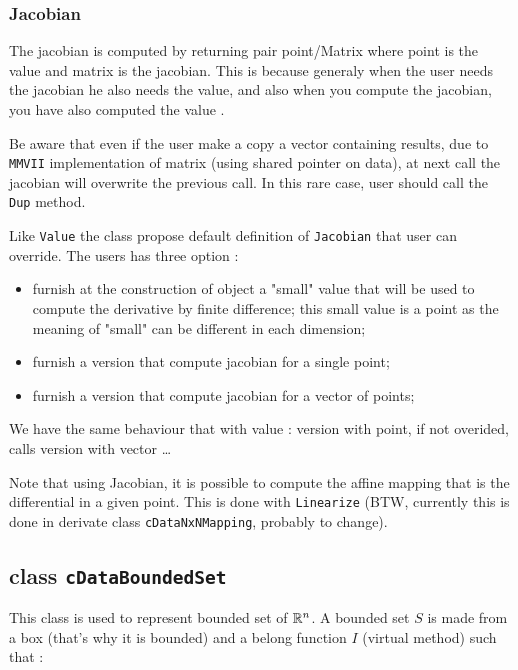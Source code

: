 \subsubsection{Jacobian}

The jacobian is computed by returning pair point/Matrix  where point is
the value  and matrix is the  jacobian. This is because generaly when the 
user needs the jacobian he also needs the value, and also when you 
compute the jacobian, you have also computed the value .

Be aware that even if the user make a copy a vector containing results,
due to {\tt MMVII} implementation of matrix (using shared pointer on data),
at next call the jacobian will overwrite the previous call.  In this rare
case, user should call the {\tt Dup} method.

Like {\tt Value} the  class propose default definition of {\tt Jacobian} that user can override.
The users has three option :

\begin{itemize}
      \item  furnish at the construction of object a "small" value that will be used to 
	      compute the derivative by finite difference;  this small value is a point as  the
             meaning of "small" can be different in each dimension;

      \item  furnish a version that compute jacobian for a single point;

      \item  furnish a version that compute jacobian for a vector of  points;
\end{itemize}

We have the same behaviour that with value : version with point, if not overided, calls version
with vector \dots 

Note that using Jacobian, it is possible to compute the affine mapping that is the
differential in a given point. This is done with {\tt Linearize}  (BTW, currently
this is done in derivate class {\tt cDataNxNMapping}, probably to change).


\subsection{class {\tt cDataBoundedSet}}

This class is used  to represent bounded set of $\mathbb{R}^n$. A bounded
set $S$ is made  from a box (that's why it is bounded) and a belong function $I$
(virtual method) such that :

